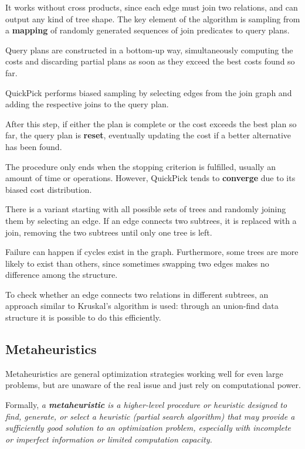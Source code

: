 It works without cross products, since each edge must join two relations, and can output any kind of tree shape. The key element of the algorithm is sampling from a \textbf{mapping} of randomly generated sequences of join predicates to query plans.

Query plans are constructed in a bottom-up way, simultaneously computing the costs and discarding partial plans as soon as they exceed the best costs found so far. 

QuickPick performs biased sampling by selecting edges from the join graph and adding the respective joins to the query plan. 

After this step, if either the plan is complete or the cost exceeds the best plan so far, the query plan is \textbf{reset}, eventually updating the cost if a better alternative has been found.

The procedure only ends when the stopping criterion is fulfilled, usually an amount of time or operations. However, QuickPick tends to \textbf{converge} due to its biased cost distribution.

There is a variant starting with all possible sets of trees and randomly joining them by selecting an edge. If an edge connects two subtrees, it is replaced with a join, removing the two subtrees until only one tree is left. 

Failure can happen if cycles exist in the graph. Furthermore, some trees are more likely to exist than others, since sometimes swapping two edges makes no difference among the structure.

To check whether an edge connects two relations in different subtrees, an approach similar to Kruskal's algorithm is used: through an union-find data structure it is possible to do this efficiently.

\subsection{Metaheuristics}
Metaheuristics are general optimization strategies working well for even large problems, but are unaware of the real issue and just rely on computational power.

Formally, \textit{a \textbf{metaheuristic} is a higher-level procedure or heuristic designed to find, generate, or select a heuristic (partial search algorithm) that may provide a sufficiently good solution to an optimization problem, especially with incomplete or imperfect information or limited computation capacity.}

